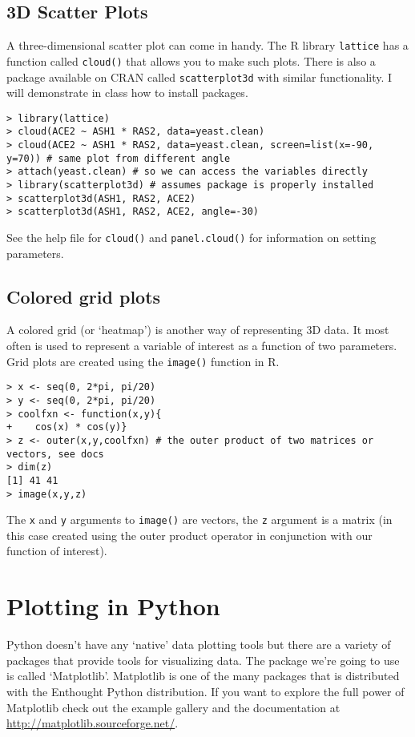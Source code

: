 \subsection{3D Scatter Plots}

A three-dimensional scatter plot can come in handy. The R library
\lstinline!lattice! has a function called \lstinline!cloud()! that
allows you to make such plots. There is also a package available on CRAN
called \lstinline!scatterplot3d! with similar functionality. I will
demonstrate in class how to install packages.

\begin{lstlisting}
> library(lattice)
> cloud(ACE2 ~ ASH1 * RAS2, data=yeast.clean)
> cloud(ACE2 ~ ASH1 * RAS2, data=yeast.clean, screen=list(x=-90, y=70)) # same plot from different angle
> attach(yeast.clean) # so we can access the variables directly
> library(scatterplot3d) # assumes package is properly installed
> scatterplot3d(ASH1, RAS2, ACE2)
> scatterplot3d(ASH1, RAS2, ACE2, angle=-30)
\end{lstlisting}
See the help file for \lstinline!cloud()! and \lstinline!panel.cloud()!
for information on setting parameters.

\subsection{Colored grid plots}

A colored grid (or `heatmap') is another way of representing 3D data. It
most often is used to represent a variable of interest as a function of
two parameters. Grid plots are created using the \lstinline!image()!
function in R.

\begin{lstlisting}
> x <- seq(0, 2*pi, pi/20)
> y <- seq(0, 2*pi, pi/20)
> coolfxn <- function(x,y){
+    cos(x) * cos(y)}
> z <- outer(x,y,coolfxn) # the outer product of two matrices or vectors, see docs
> dim(z)
[1] 41 41
> image(x,y,z)
\end{lstlisting}
The \lstinline!x! and \lstinline!y! arguments to \lstinline!image()! are
vectors, the \lstinline!z! argument is a matrix (in this case created
using the outer product operator in conjunction with our function of
interest).

\section{Plotting in Python}

Python doesn't have any `native' data plotting tools but there are a
variety of packages that provide tools for visualizing data. The package
we're going to use is called `Matplotlib'. Matplotlib is one of the many
packages that is distributed with the Enthought Python distribution. If
you want to explore the full power of Matplotlib check out the example
gallery and the documentation at
\url{http://matplotlib.sourceforge.net/}.

